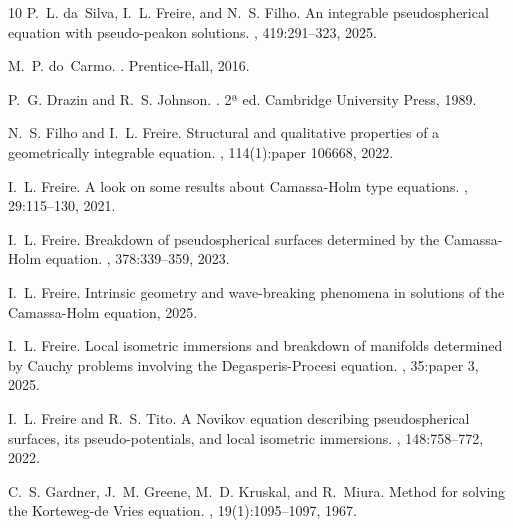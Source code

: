 \documentclass{cimart}
\begin{document}
{\begin{thebibliography}{10}
        P.~L. da~Silva, I.~L. Freire, and N.~S. Filho.
        \newblock An integrable pseudospherical equation with pseudo-peakon solutions.
        , 419:291--323, 2025.
        
        M.~P. do~Carmo.
        .
        \newblock Prentice-Hall, 2016.
        
        P.~G. Drazin and R.~S. Johnson.
        .
        \newblock 2ª ed. Cambridge University Press, 1989.
        
        N.~S. Filho and I.~L. Freire.
        \newblock Structural and qualitative properties of a geometrically integrable
          equation.
        , 114(1):paper 106668, 2022.
        
        I.~L. Freire.
        \newblock A look on some results about {C}amassa-{H}olm type equations.
        , 29:115--130, 2021.
        
        I.~L. Freire.
        \newblock Breakdown of pseudospherical surfaces determined by the
          {C}amassa-{H}olm equation.
        , 378:339--359, 2023.
        
        I.~L. Freire.
        \newblock Intrinsic geometry and wave-breaking phenomena in solutions of the
          {C}amassa-{H}olm equation, 2025.
        
        I.~L. Freire.
        \newblock Local isometric immersions and breakdown of manifolds determined by
          {C}auchy problems involving the {D}egasperis-{P}rocesi equation.
        , 35:paper 3, 2025.
        
        I.~L. Freire and R.~S. Tito.
        \newblock A {N}ovikov equation describing pseudospherical surfaces, its
          pseudo-potentials, and local isometric immersions.
        , 148:758--772, 2022.
        
        C.~S. Gardner, J.~M. Greene, M.~D. Kruskal, and R.~Miura.
        \newblock Method for solving the {K}orteweg-de {V}ries equation.
        , 19(1):1095--1097, 1967.
        

\end{thebibliography}}
\end{document}

